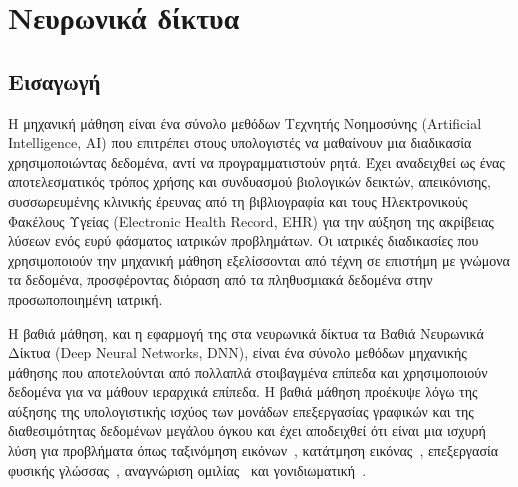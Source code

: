 \chapter{Νευρωνικά δίκτυα}
\label{chapter2}
\graphicspath{{./images/deep-learning-in-cardiology/}}

\newcommand{\networkLayer}[6]{
	\def\a{#1}
	\def\b{0.02}
	\def\c{#2}
	\def\t{#3}
	\def\d{#4}
	\draw[line width=0.3mm] (\c+\t,0,\d) -- (\c+\t,\a,\d) -- (\t,\a,\d);                                                      %
	\draw[line width=0.3mm] (\t,0,\a+\d) -- (\c+\t,0,\a+\d) node[midway,below] {#6} -- (\c+\t,\a,\a+\d) -- (\t,\a,\a+\d) -- (\t,0,\a+\d); %
	\draw[line width=0.3mm] (\c+\t,0,\d) -- (\c+\t,0,\a+\d);
	\draw[line width=0.3mm] (\c+\t,\a,\d) -- (\c+\t,\a,\a+\d);
	\draw[line width=0.3mm] (\t,\a,\d) -- (\t,\a,\a+\d);
	\filldraw[#5] (\t+\b,\b,\a+\d) -- (\c+\t-\b,\b,\a+\d) -- (\c+\t-\b,\a-\b,\a+\d) -- (\t+\b,\a-\b,\a+\d) -- (\t+\b,\b,\a+\d); %
	\filldraw[#5] (\t+\b,\a,\a-\b+\d) -- (\c+\t-\b,\a,\a-\b+\d) -- (\c+\t-\b,\a,\b+\d) -- (\t+\b,\a,\b+\d);
	\ifthenelse {\equal{#5} {}}
	{}
	{\filldraw[#5] (\c+\t,\b,\a-\b+\d) -- (\c+\t,\b,\b+\d) -- (\c+\t,\a-\b,\b+\d) -- (\c+\t,\a-\b,\a-\b+\d);} %
}

\section{Εισαγωγή}
Η μηχανική μάθηση είναι ένα σύνολο μεθόδων Τεχνητής Νοημοσύνης (Artificial Intelligence, AI) που επιτρέπει στους υπολογιστές να μαθαίνουν μια διαδικασία χρησιμοποιώντας δεδομένα, αντί να προγραμματιστούν ρητά.
Έχει αναδειχθεί ως ένας αποτελεσματικός τρόπος χρήσης και συνδυασμού βιολογικών δεικτών, απεικόνισης, συσσωρευμένης κλινικής έρευνας από τη βιβλιογραφία και τους Ηλεκτρονικούς Φακέλους Υγείας (Electronic Health Record, EHR) για την αύξηση της ακρίβειας λύσεων ενός ευρύ φάσματος ιατρικών προβλημάτων.
Οι ιατρικές διαδικασίες που χρησιμοποιούν την μηχανική μάθηση εξελίσσονται από τέχνη σε επιστήμη με γνώμονα τα δεδομένα, προσφέροντας διόραση από τα πληθυσμιακά δεδομένα στην προσωποποιημένη ιατρική.

Η βαθιά μάθηση, και η εφαρμογή της στα νευρωνικά δίκτυα τα Βαθιά Νευρωνικά Δίκτυα (Deep Neural Networks, DNN), είναι ένα σύνολο μεθόδων μηχανικής μάθησης που αποτελούνται από πολλαπλά στοιβαγμένα επίπεδα και χρησιμοποιούν δεδομένα για να μάθουν ιεραρχικά επίπεδα.
Η βαθιά μάθηση προέκυψε λόγω της αύξησης της υπολογιστικής ισχύος των μονάδων επεξεργασίας γραφικών και της διαθεσιμότητας δεδομένων μεγάλου όγκου και έχει αποδειχθεί ότι είναι μια ισχυρή λύση για προβλήματα όπως ταξινόμηση εικόνων~\cite{krizhevsky2012imagenet}, κατάτμηση εικόνας~\cite{ronneberger2015u}, επεξεργασία φυσικής γλώσσας~\cite{collobert2008unified}, αναγνώριση ομιλίας~\cite{graves2013speech} και γονιδιωματική~\cite{alipanahi2015predicting}.

